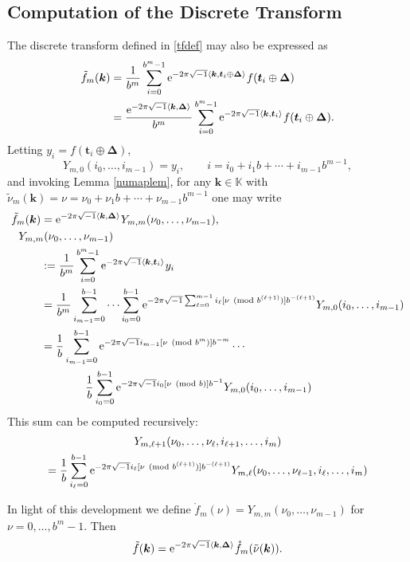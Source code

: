 \documentclass[graybox,footinfo]{svmult}
\newcommand{\vt}{\boldsymbol{t}}    %
\newcommand{\vDelta}{\boldsymbol{\Delta}}    %
\newcommand{\bbK}{\mathbb{K}}
\newcommand{\ip}[3][{}]{\ensuremath{\left \langle #2, #3 \right \rangle_{#1}}}
\newcommand{\vk}{\boldsymbol{k}}    %
\newcommand{\tnu}{\tilde{\nu}}
\newcommand{\tf}{\tilde{f}}
\begin{document}
\subsection{Computation of the Discrete Transform}
The discrete transform defined in \eqref{tfdef} may also be expressed as
\begin{align}
\nonumber
\tf_m(\vk)
&= \frac{1}{b^m} \sum_{i=0}^{b^m-1} \E^{-2 \pi \sqrt{-1} \ip{\vk}{\vt_i\oplus \vDelta}} f(\vt_i\oplus \vDelta) \\
\nonumber
&= \frac{\E^{-2 \pi \sqrt{-1} \ip{\vk}{\vDelta}}}{b^m} \sum_{i=0}^{b^m-1} \E^{-2 \pi \sqrt{-1} \ip{\vk}{\vt_i}} f(\vt_i\oplus \vDelta).
\end{align}
Letting $y_i=f(\vt_i\oplus \vDelta)$,
\[
Y_{m,0}(i_0,\ldots, i_{m-1}) = y_i, \qquad i=i_0 + i_1 b + \cdots + i_{m-1} b^{m-1},
\]
and invoking Lemma \ref{numaplem}, for any $\vk \in \bbK$ with $\tnu_m(\vk)=\nu = \nu_0 + \nu_1 b  + \cdots + \nu_{m-1} b^{m-1}$ one may write
\begin{align}
\nonumber
\tf_m(\vk) &= \E^{-2 \pi \sqrt{-1} \ip{\vk}{\vDelta}}  Y_{m,m}(\nu_0, \ldots, \nu_{m-1}) , \\
\nonumber
\MoveEqLeft{Y_{m,m}(\nu_0, \ldots, \nu_{m-1})}\\
\nonumber
& : = \frac{1}{b^m} \sum_{i=0}^{b^m-1} \E^{-2 \pi \sqrt{-1} \ip{\vk}{\vt_i}} y_i \\
\nonumber
& = \frac{1}{b^m} \sum_{i_{m-1}=0}^{b-1} \cdots \sum_{i_0=0}^{b-1} \E^{-2 \pi \sqrt{-1}\sum_{\ell=0}^{m-1} i_\ell [\nu \pmod  {b^{(\ell+1)}}]  b^{-(\ell+1)}} Y_{m,0}(i_0,\ldots, i_{m-1}) \\
\nonumber
& = \frac{1}{b} \sum_{i_{m-1}=0}^{b-1}\E^{-2 \pi \sqrt{-1}  i_{m-1}[\nu \pmod  {b^{m}}]  b^{-m}}  \cdots \\
&\qquad \qquad \frac{1}{b} \sum_{i_0=0}^{b-1} \E^{-2 \pi \sqrt{-1} i_0 [\nu \pmod  {b}]  b^{-1}} Y_{m,0}(i_0,\ldots, i_{m-1})
\nonumber
\end{align}
This sum can be computed recursively:
\begin{multline*}
Y_{m,\ell+1}(\nu_0, \ldots, \nu_{\ell},i_{\ell+1}, \ldots, i_m) \\
= \frac{1}{b} \sum_{i_\ell=0}^{b-1} \mathrm{e}^{-2 \pi \sqrt{-1}  i_{\ell}[\nu \pmod  {b^{(\ell+1)}}]  b^{-(\ell+1)}} Y_{m,\ell}(\nu_0, \ldots, \nu_{\ell-1},i_{\ell}, \ldots, i_m)
\end{multline*}

In light of this development we define $\mathring{f}_m(\nu)=Y_{m,m}(\nu_0, \ldots, \nu_{m-1})$ for $\nu=0, \ldots, b^{m}-1$. Then
\[
\tf(\vk) = \E^{-2 \pi \sqrt{-1} \ip{\vk}{\vDelta}} \mathring{f}_m(\tnu(\vk)).
\]
\end{document}
